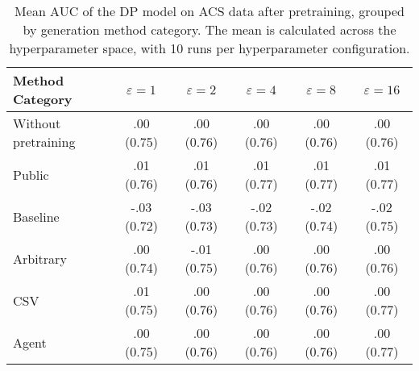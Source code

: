 \begin{table}[h!]
    \centering
    \caption{Mean AUC of the DP model on ACS data after pretraining, grouped by generation method category. The mean is calculated across the hyperparameter space, with 10 runs per hyperparameter configuration.}
    \label{tab:epsilon_comparison}
    \begin{tabular}{lccccc}
    \toprule
    Method Category & $\varepsilon=1$ & $\varepsilon=2$ & $\varepsilon=4$ & $\varepsilon=8$ & $\varepsilon=16$ \\
    \midrule
    Without pretraining & .00 {\small (0.75)} & .00 {\small (0.76)} & .00 {\small (0.76)} & .00 {\small (0.76)} & .00 {\small (0.76)} \\
    \arrayrulecolor{black!50!}\midrule
    Public & \cellcolor{gold!30}.01 {\small (0.76)} & \cellcolor{gold!30}.01 {\small (0.76)} & \cellcolor{gold!30}.01 {\small (0.77)} & \cellcolor{gold!30}.01 {\small (0.77)} & \cellcolor{gold!30}.01 {\small (0.77)} \\
    \arrayrulecolor{black!50!}\midrule
    Baseline & -.03 {\small (0.72)} & -.03 {\small (0.73)} & -.02 {\small (0.73)} & -.02 {\small (0.74)} & -.02 {\small (0.75)} \\
    \arrayrulecolor{black!50!}\midrule
    Arbitrary & .00 {\small (0.74)} & -.01 {\small (0.75)} & \cellcolor{bronze!30}.00 {\small (0.76)} & .00 {\small (0.76)} & .00 {\small (0.76)} \\
    \arrayrulecolor{black!50!}\midrule
    CSV & \cellcolor{silver!30}.01 {\small (0.75)} & \cellcolor{silver!30}.00 {\small (0.76)} & \cellcolor{silver!30}.00 {\small (0.76)} & \cellcolor{silver!30}.00 {\small (0.76)} & \cellcolor{bronze!30}.00 {\small (0.77)} \\
    Agent & \cellcolor{bronze!30}.00 {\small (0.75)} & \cellcolor{bronze!30}.00 {\small (0.76)} & \cellcolor{silver!30}.00 {\small (0.76)} & \cellcolor{bronze!30}.00 {\small (0.76)} & \cellcolor{silver!30}.00 {\small (0.77)} \\
    \bottomrule
    \end{tabular}
\end{table}
